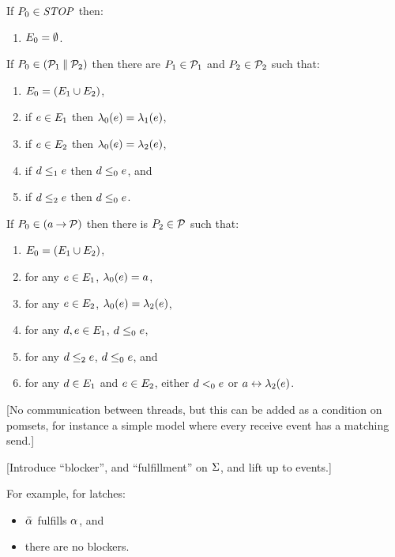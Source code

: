 \begin{figure*}
  If $P_0\in\mathit{STOP}$ then:
  \begin{enumerate}
    \item $E_0 = \emptyset$.
  \end{enumerate}
  If $P_0 \in (\mathcal{P}_1\mathbin{\parallel}\mathcal{P}_2)$ then
  there are $P_1\in\mathcal{P}_1$ and $P_2\in\mathcal{P}_2$ such that:
  \begin{enumerate}
  \item $E_0 = (E_1\cup E_2)$,
  \item if $e\in E_1$ then $\lambda_0(e) = \lambda_1(e)$, 
  \item if $e\in E_2$ then $\lambda_0(e) = \lambda_2(e)$,
  \item if $d\le_1e$ then $d\le_0e$, and
  \item if $d\le_2e$ then $d\le_0e$.
    \setcounter{pomsetParCount}{\value{enumi}}
  \end{enumerate}
  If $P_0 \in (a\mathbin{\rightarrow}\mathcal{P})$ then there is $P_2\in\mathcal{P}$ such that:
  \begin{enumerate}
  \item $E_0=(E_1 \cup E_2)$,
  \item for any $e\in E_1$, $\lambda_0(e) = a$,
  \item for any $e\in E_2$, $\lambda_0(e) = \lambda_2(e)$,
  \item for any $d,e\in E_1$, $d\le_0e$,
  \item for any $d\le_2e$, $d\le_0e$, and
  \item for any $d\in E_1$ and $e\in E_2$, either $d<_0e$ or $a\mathrel\leftrightarrow\lambda_2(e)$.
    \setcounter{pomsetPrefixCount}{\value{enumi}}
  \end{enumerate}
\caption{Process algebra as sets of pomsets}
\end{figure*}

[No communication between threads, but this can be added as a condition on pomsets,
  for instance a simple model where every receive event has a matching send.]

[Introduce ``blocker'', and ``fulfillment'' on $\Sigma$, and lift up to events.]

For example, for latches:
\begin{itemize}
\item $\bar{\alpha}_{}$ fulfills ${\alpha}_{}$, and
\item there are no blockers.
\end{itemize}
  

